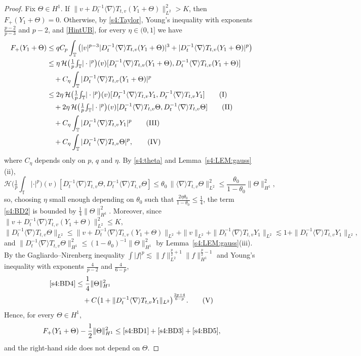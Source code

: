 \documentclass[letterpaper, 11pt,  reqno]{amsart}
\theoremstyle{definition}
\newcommand{\1}{\mathbbm 1}
\newcommand{\T}{\mathbb{T}}
\newcommand{\0}{\mathbf 0}
\newcommand{\nb}{\nabla}
\newcommand{\les}{\lesssim}
\newcommand{\jb}[1]
{\langle #1 \rangle}
\numberwithin{equation}{section}
\numberwithin{theorem}{section}
\newcommand{\HF}[2]{\mathcal H\big(\tfrac1p{\textstyle\int_\T}|\cdot|^p\big)(#1)[#2]}
\begin{document}
\begin{proof}
Fix $\Theta\in H^1$. If $\|v+D_t^{-1}\jb\nb T_{t,v}(Y_1+\Theta)\|_{L^2}^2>K$, then $F_+(Y_1+\Theta)=0$. Otherwise,
by \eqref{s4:Taylor}, Young's inequality with exponents $\frac{p-2}{p-3}$ and $p-2$, and
\eqref{HintUB}, for every $\eta\in(0,1]$ we have
\begin{align}
F_+(Y_1+\Theta)&\le qC_p\int_\T\big(|v|^{p-3}|D_t^{-1}\jb\nb T_{t,v}(Y_1+\Theta)|^3+|D_t^{-1}\jb\nb T_{t,v}(Y_1+\Theta)|^p\big)\notag\\
&\le\eta\,\HF{v}{D_t^{-1}\jb\nb T_{t,v}(Y_1+\Theta),D_t^{-1}\jb\nb T_{t,v}(Y_1+\Theta)}\notag\\
&\quad+C_\eta\int_\T|D_t^{-1}\jb\nb T_{t,v}(Y_1+\Theta)|^p\notag\\
&\le2\eta\,\HF{v}{D_t^{-1}\jb\nb T_{t,v}Y_1,D_t^{-1}\jb\nb T_{t,v}Y_1}\tag{I}\label{s4:BD1}\\
&\quad+2\eta\,\HF{v}{D_t^{-1}\jb\nb T_{t,v}\Theta,D_t^{-1}\jb\nb T_{t,v}\Theta}\tag{II}\label{s4:BD2}\\
&\quad+C_\eta\int_\T|D_t^{-1}\jb\nb T_{t,v}Y_1|^p\tag{III}\label{s4:BD3}\\
&\quad+C_\eta\int_\T|D_t^{-1}\jb\nb T_{t,v}\Theta|^p ,\tag{IV}\label{s4:BD4}
\end{align}
where $C_\eta$ depends only on $p$, $q$ and $\eta$. By \eqref{s4:theta} and
Lemma~\ref{s4:LEM:gauss}(ii),
\[
\HF{v}{D_t^{-1}\jb\nb T_{t,v}\Theta,D_t^{-1}\jb\nb T_{t,v}\Theta}\le\theta_0\,\|\jb\nb T_{t,v}\Theta\|_{L^2}^2\le\frac{\theta_0}{1-\theta_0}\|\Theta\|_{H^1}^2 ,
\]
so, choosing $\eta$ small enough depending on $\theta_0$ such that $\frac{2\eta \theta_0}{1-\theta_0} \le \frac14$,
the term \eqref{s4:BD2}
is bounded by $\frac{1}{4}\|\Theta\|_{H^1}^2$.
Moreover, since $\|v+D_t^{-1}\jb\nb T_{t,v}(Y_1+\Theta)\|_{L^2}^2\le K$,
\[
\|D_t^{-1}\jb\nb T_{t,v}\Theta\|_{L^2}\le\|v+D_t^{-1}\jb\nb T_{t,v}(Y_1+\Theta)\|_{L^2}+\|v\|_{L^2}+\|D_t^{-1}\jb\nb T_{t,v}Y_1\|_{L^2}\les1+\|D_t^{-1}\jb\nb T_{t,v}Y_1\|_{L^2},
\]
and $\|D_t^{-1}\jb\nb T_{t,v}\Theta\|_{H^1}^2\le(1-\theta_0)^{-1}\|\Theta\|_{H^1}^2$ by Lemma~\ref{s4:LEM:gauss}(iii). By the
Gagliardo--Nirenberg inequality $\int|f|^p\les\|f\|_{L^2}^{\frac p2+1}\|f\|_{H^1}^{\frac p2-1}$ and
Young's inequality with exponents $\frac4{p-2}$ and $\frac4{6-p}$,
\begin{align}
\eqref{s4:BD4}&\le\frac14\|\Theta\|_{H^1}^2\notag\\
&\quad+C\big(1+\|D_t^{-1}\jb\nb T_{t,v}Y_1\|_{L^2}\big)^{\frac{2p+4}{6-p}} .\tag{V}\label{s4:BD5}
\end{align}
Hence, for every $\Theta\in H^1$,
\[
F_+(Y_1+\Theta)-\frac12\|\Theta\|_{H^1}^2\le\eqref{s4:BD1}+\eqref{s4:BD3}+\eqref{s4:BD5},
\]
and the right-hand side does not depend on $\Theta$.


\end{proof}
\end{document}
